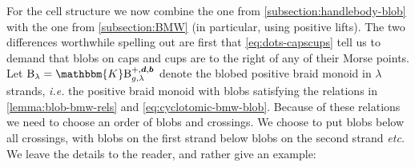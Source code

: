 \documentclass[a4paper,11pt]{amsart}
\newcommand{\ie}{\textsl{i.e.}}
\newcommand{\etc}{\textsl{etc.}}
\newcommand{\setstuff}[1]{\mathrm{#1}}
\newcommand{\KK}{\mathbbm{K}}
\newcommand{\bsym}[1]{\boldsymbol{#1}}
\newcommand{\bpar}{\bsym{b}}
\newcommand{\dpar}{\bsym{d}}
\numberwithin{equation}{section}
\let\fullref\autoref
\begin{document}
For the cell structure we now combine 
the one from \fullref{subsection:handlebody-blob} with the 
one from \fullref{subsection:BMW} 
(in particular, using positive lifts). The two
differences worthwhile spelling out are first 
that \eqref{eq:dots-capscups} 
tell us to demand that blobs on caps and cups are 
to the right of any of their Morse points. 
Let $\setstuff{B}_{\lambda}=
\KK\setstuff{B}_{g,\lambda}^{+,\dpar,\bpar}$ denote the 
blobed positive braid monoid in $\lambda$ 
strands, {\ie} the positive braid monoid with blobs satisfying the relations in 
\fullref{lemma:blob-bmw-rels}
and \eqref{eq:cyclotomic-bmw-blob}.
Because of these relations
we need to choose an order of blobs and crossings. We choose 
to put blobs below all crossings, with blobs on the first strand 
below blobs on the second strand {\etc}
We leave the details to the reader, and rather give an example:
\end{document}
